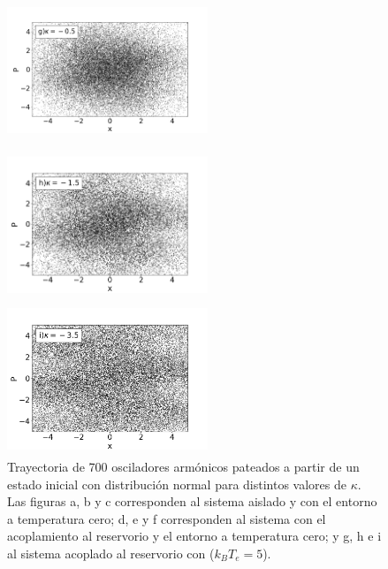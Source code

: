 \documentclass[letterpaper,12pt,oneside]{book}
\begin{document}
\begin{figure}[h!]
\begin{minipage}{0.32\textwidth}
		\includegraphics[width=6cm,height=4.5cm]{FigsJPG/PhaseSpace_g}
	\end{minipage}
	\begin{minipage}{0.32\textwidth}
		\includegraphics[width=6cm,height=4.5cm]{FigsJPG/PhaseSpace_h}
	\end{minipage}
	\begin{minipage}{0.32\textwidth}
		\includegraphics[width=6cm,height=4.5cm]{FigsJPG/PhaseSpace_i}
		
	\end{minipage}
	
	
	\caption{Trayectoria de 700 osciladores arm\'onicos pateados a partir de un estado inicial con distribuci\'on normal para distintos valores de $\kappa$. Las figuras a, b y c corresponden al sistema aislado y con el entorno a temperatura cero; d, e y f corresponden al sistema con el acoplamiento al reservorio y el entorno a temperatura cero; y g, h e i al sistema acoplado al reservorio con ($k_BT_e = 5$).}
	\label{Img:EspaciosDeFase}
	
\end{figure}
\end{document}
